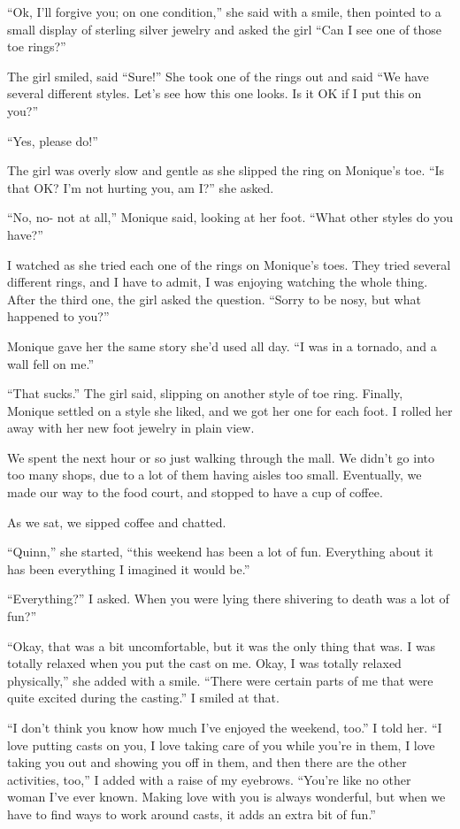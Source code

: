 ``Ok, I'll forgive you; on one condition,'' she said with a smile, then pointed to a small
display of sterling silver jewelry and asked the girl ``Can I see one of those toe rings?''

The girl smiled, said ``Sure!'' She took one of the rings out and said ``We have several
different styles. Let's see how this one looks. Is it OK if I put this on you?''

``Yes, please do!''

The girl was overly slow and gentle as she slipped the ring on Monique's toe. ``Is that OK?
I'm not hurting you, am I?'' she asked.

``No, no- not at all,'' Monique said, looking at her foot. ``What other styles do you have?''

I watched as she tried each one of the rings on Monique's toes. They tried several
different rings, and I have to admit, I was enjoying watching the whole thing. After the third
one, the girl asked the question. ``Sorry to be nosy, but what happened to you?''

Monique gave her the same story she'd used all day. ``I was in a tornado, and a wall fell on
me.''

``That sucks.'' The girl said, slipping on another style of toe ring. Finally, Monique
settled on a style she liked, and we got her one for each foot. I rolled her away with her new
foot jewelry in plain view.

We spent the next hour or so just walking through the mall. We didn't go into too many
shops, due to a lot of them having aisles too small. Eventually, we made our way to the food
court, and stopped to have a cup of coffee.

As we sat, we sipped coffee and chatted.

``Quinn,'' she started, ``this weekend has been a lot of fun. Everything about it has been
everything I imagined it would be.''

``Everything?'' I asked. When you were lying there shivering to death was a lot of fun?''

``Okay, that was a bit uncomfortable, but it was the only thing that was. I was totally
relaxed when you put the cast on me. Okay, I was totally relaxed physically,'' she added with a
smile. ``There were certain parts of me that were quite excited during the casting.'' I smiled
at
that.

``I don't think you know how much I've enjoyed the weekend, too.'' I told her. ``I love
putting casts on you, I love taking care of you while you're in them, I love taking you out and
showing you off in them, and then there are the other activities, too,'' I added with a raise of
my eyebrows. ``You're like no other woman I've ever known. Making love with you is always
wonderful, but when we have to find ways to work around casts, it adds an extra bit of fun.''


